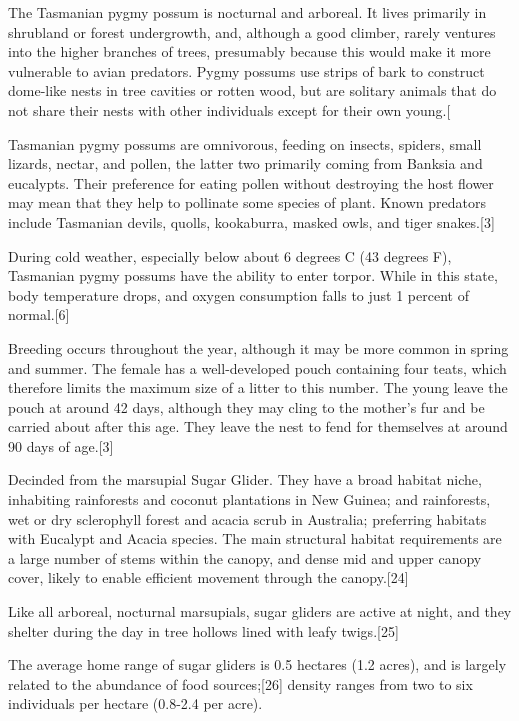 \documentclass[twoside, 12pt, letterpaper]{report}\usepackage[]{graphicx}\usepackage[]{color}
\begin{document}
\begin{multicols*}{2}
The Tasmanian pygmy possum is nocturnal and arboreal. It lives primarily in shrubland or forest undergrowth, and, although a good climber, rarely ventures into the higher branches of trees, presumably because this would make it more vulnerable to avian predators. Pygmy possums use strips of bark to construct dome-like nests in tree cavities or rotten wood, but are solitary animals that do not share their nests with other individuals except for their own young.[

Tasmanian pygmy possums are omnivorous, feeding on insects, spiders, small lizards, nectar, and pollen, the latter two primarily coming from Banksia and eucalypts. Their preference for eating pollen without destroying the host flower may mean that they help to pollinate some species of plant. Known predators include Tasmanian devils, quolls, kookaburra, masked owls, and tiger snakes.[3]

During cold weather, especially below about 6 degrees C (43 degrees F), Tasmanian pygmy possums have the ability to enter torpor. While in this state, body temperature drops, and oxygen consumption falls to just 1 percent of normal.[6]

Breeding occurs throughout the year, although it may be more common in spring and summer. The female has a well-developed pouch containing four teats, which therefore limits the maximum size of a litter to this number. The young leave the pouch at around 42 days, although they may cling to the mother's fur and be carried about after this age. They leave the nest to fend for themselves at around 90 days of age.[3]

\nsubsection{\glider}
Decinded from the marsupial Sugar Glider. They have a broad habitat niche, inhabiting rainforests and coconut plantations in New Guinea; and rainforests, wet or dry sclerophyll forest and acacia scrub in Australia; preferring habitats with Eucalypt and Acacia species. The main structural habitat requirements are a large number of stems within the canopy, and dense mid and upper canopy cover, likely to enable efficient movement through the canopy.[24]

Like all arboreal, nocturnal marsupials, sugar gliders are active at night, and they shelter during the day in tree hollows lined with leafy twigs.[25]

The average home range of sugar gliders is 0.5 hectares (1.2 acres), and is largely related to the abundance of food sources;[26] density ranges from two to six individuals per hectare (0.8-2.4 per acre).


\end{multicols*}
\end{document}
